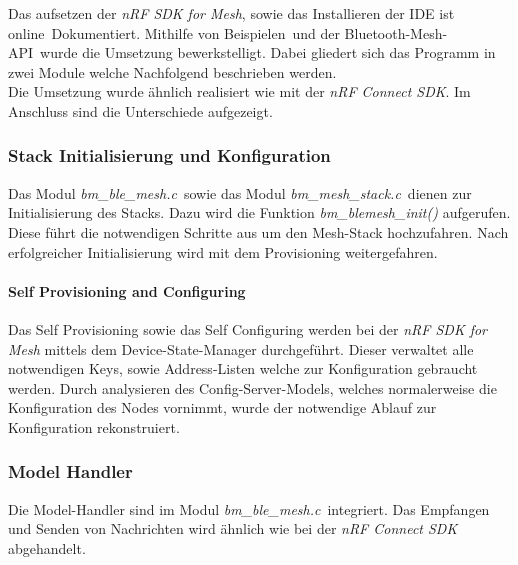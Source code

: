 Das aufsetzen der \textit{nRF SDK for Mesh}, sowie das Installieren der IDE ist online\footnotemark\ Dokumentiert. Mithilfe von Beispielen\footnotemark\ und der Bluetooth-Mesh-API\footnotemark\ wurde die Umsetzung bewerkstelligt. Dabei gliedert sich das Programm in zwei Module welche Nachfolgend beschrieben werden.\\

Die Umsetzung wurde ähnlich realisiert wie mit der \textit{nRF Connect SDK}. Im Anschluss sind die Unterschiede aufgezeigt. 






\subsubsection{Stack Initialisierung und Konfiguration}\label{subsubsec:BluetoothMeshUmsetzungnRFSDKInitandConfig} 

Das Modul \textit{bm\_ble\_mesh.c}\footnotemark\ sowie das Modul \textit{bm\_mesh\_stack.c}\footnotemark\ dienen zur Initialisierung des Stacks. Dazu wird die Funktion \textit{bm\_blemesh\_init()} aufgerufen. Diese führt die notwendigen Schritte aus um den Mesh-Stack hochzufahren. Nach erfolgreicher Initialisierung wird mit dem Provisioning weitergefahren. \\




\paragraph{Self Provisioning and Configuring}

Das Self Provisioning sowie das Self Configuring werden bei der \textit{nRF SDK for Mesh} mittels dem Device-State-Manager durchgeführt. Dieser verwaltet alle notwendigen Keys, sowie Address-Listen welche zur Konfiguration gebraucht werden. Durch analysieren des Config-Server-Models, welches normalerweise die Konfiguration des Nodes vornimmt, wurde der notwendige Ablauf zur Konfiguration rekonstruiert. 

\subsubsection{Model Handler}\label{subsubsec:BluetoothMeshUmsetzungnRFSDKModelHandler}

Die Model-Handler sind im Modul \textit{bm\_ble\_mesh.c}\footnotemark\ integriert. Das Empfangen und Senden von Nachrichten wird ähnlich wie bei der \textit{nRF Connect SDK} abgehandelt. 
